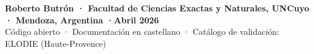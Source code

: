 \documentclass[final]{beamer}
\begin{document}
\begin{frame}[t]{}
\begin{center}
  \color{white}
  {\large\bfseries Roberto Butrón \enspace·\enspace
  Facultad de Ciencias Exactas y Naturales, UNCuyo \enspace·\enspace
  Mendoza, Argentina \enspace·\enspace Abril 2026}\\[0.2cm]
  {\normalsize Código abierto \enspace·\enspace
  Documentación en castellano \enspace·\enspace
  Catálogo de validación: ELODIE (Haute-Provence)}
\end{center}

\end{frame}
\end{document}
